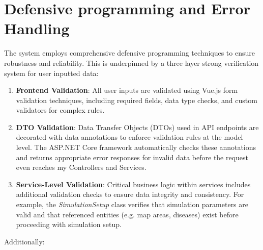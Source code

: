 \section{Defensive programming and Error Handling}
The system employs comprehensive defensive programming techniques to ensure robustness and reliability. This is underpinned by a three layer strong verification system for user inputted data:
\begin{enumerate}
    \item \textbf{Frontend Validation}: All user inputs are validated using Vue.js form validation techniques, including required fields, data type checks, and custom validators for complex rules.
    \item \textbf{DTO Validation}: Data Transfer Objects (DTOs) used in API endpoints are decorated with data annotations to enforce validation rules at the model level. The ASP.NET Core framework automatically checks these annotations and returns appropriate error responses for invalid data before the request even reaches my Controllers and Services.
    \item \textbf{Service-Level Validation}: Critical business logic within services includes additional validation checks to ensure data integrity and consistency. For example, the \textit{SimulationSetup} class verifies that simulation parameters are valid and that referenced entities (e.g. map areas, diseases) exist before proceeding with simulation setup.
\end{enumerate}
Additionally:
